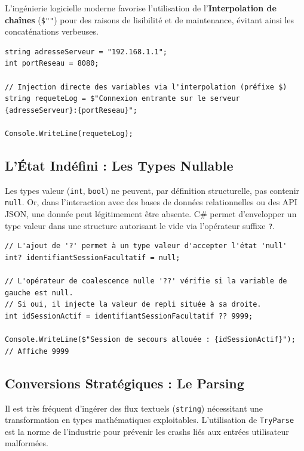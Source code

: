 L'ingénierie logicielle moderne favorise l'utilisation de l'\textbf{Interpolation de chaînes} (\texttt{\$"{}"}) pour des raisons de lisibilité et de maintenance, évitant ainsi les concaténations verbeuses.

\begin{lstlisting}[caption={Interpolation de chaînes de caractères}]
string adresseServeur = "192.168.1.1";
int portReseau = 8080;

// Injection directe des variables via l'interpolation (préfixe $)
string requeteLog = $"Connexion entrante sur le serveur {adresseServeur}:{portReseau}";

Console.WriteLine(requeteLog);
\end{lstlisting}

\subsection{L'État Indéfini : Les Types Nullable}

Les types valeur (\texttt{int}, \texttt{bool}) ne peuvent, par définition structurelle, pas contenir \texttt{null}. Or, dans l'interaction avec des bases de données relationnelles ou des API JSON, une donnée peut légitimement être absente. 
C\# permet d'envelopper un type valeur dans une structure autorisant le vide via l'opérateur suffixe \texttt{?}.

\begin{lstlisting}[caption={Types nullable et opérateur de coalescence}]
// L'ajout de '?' permet à un type valeur d'accepter l'état 'null'
int? identifiantSessionFacultatif = null;

// L'opérateur de coalescence nulle '??' vérifie si la variable de gauche est null.
// Si oui, il injecte la valeur de repli située à sa droite.
int idSessionActif = identifiantSessionFacultatif ?? 9999;

Console.WriteLine($"Session de secours allouée : {idSessionActif}"); // Affiche 9999
\end{lstlisting}

\subsection{Conversions Stratégiques : Le Parsing}

Il est très fréquent d'ingérer des flux textuels (\texttt{string}) nécessitant une transformation en types mathématiques exploitables. L'utilisation de \texttt{TryParse} est la norme de l'industrie pour prévenir les crashs liés aux entrées utilisateur malformées.

